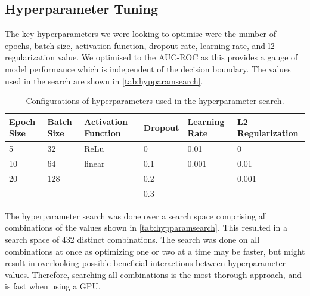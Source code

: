 \subsection{Hyperparameter Tuning}
\label{sec:hyptune}
The key hyperparameters we were looking to optimise were the number of epochs, batch size, activation function, dropout rate, learning rate, and l2 regularization value. We optimised to the AUC-ROC as this provides a gauge of model performance which is independent of the decision boundary. The values used in the search are shown in \autoref{tab:hypparamsearch}.

\begin{table}[H]
\begin{tabular}{|l|l|l|l|l|l|}
\hline
\rowcolor[HTML]{EFEFEF} 
\textbf{Epoch Size} & \textbf{Batch Size} & \textbf{Activation Function} & \textbf{Dropout} & \textbf{Learning Rate} & \textbf{L2 Regularization} \\ \hline
5                   & 32                  & ReLu                         & 0                & 0.01                   & 0                          \\ \hline
10                  & 64                  & linear                       & 0.1              & 0.001                  & 0.01                       \\ \hline
20                  & 128                 &                              & 0.2              &                        & 0.001                      \\ \hline
                    &                     &                              & 0.3              &                        &                            \\ \hline
\end{tabular}
\caption{Configurations of hyperparameters used in the hyperparameter search.}
\label{tab:hypparamsearch}
\end{table}

The hyperparameter search was done over a search space comprising all combinations of the values shown in \autoref{tab:hypparamsearch}. This resulted in a search space of 432 distinct combinations. The search was done on all combinations at once as optimizing one or two at a time may be faster, but might result in overlooking possible
beneficial interactions between hyperparameter values. Therefore, searching all combinations is the most thorough approach, and is fast when using a GPU. 

